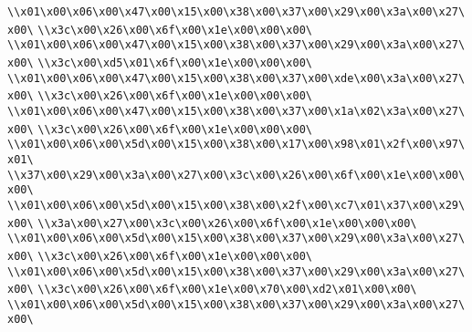 \verb|\\x01\x00\x06\x00\x47\x00\x15\x00\x38\x00\x37\x00\x29\x00\x3a\x00\x27\x00\|\newline
\verb|\\x3c\x00\x26\x00\x6f\x00\x1e\x00\x00\x00\|\newline
\verb|\\x01\x00\x06\x00\x47\x00\x15\x00\x38\x00\x37\x00\x29\x00\x3a\x00\x27\x00\|\newline
\verb|\\x3c\x00\xd5\x01\x6f\x00\x1e\x00\x00\x00\|\newline
\verb|\\x01\x00\x06\x00\x47\x00\x15\x00\x38\x00\x37\x00\xde\x00\x3a\x00\x27\x00\|\newline
\verb|\\x3c\x00\x26\x00\x6f\x00\x1e\x00\x00\x00\|\newline
\verb|\\x01\x00\x06\x00\x47\x00\x15\x00\x38\x00\x37\x00\x1a\x02\x3a\x00\x27\x00\|\newline
\verb|\\x3c\x00\x26\x00\x6f\x00\x1e\x00\x00\x00\|\newline
\verb|\\x01\x00\x06\x00\x5d\x00\x15\x00\x38\x00\x17\x00\x98\x01\x2f\x00\x97\x01\|\newline
\verb|\\x37\x00\x29\x00\x3a\x00\x27\x00\x3c\x00\x26\x00\x6f\x00\x1e\x00\x00\x00\|\newline
\verb|\\x01\x00\x06\x00\x5d\x00\x15\x00\x38\x00\x2f\x00\xc7\x01\x37\x00\x29\x00\|\newline
\verb|\\x3a\x00\x27\x00\x3c\x00\x26\x00\x6f\x00\x1e\x00\x00\x00\|\newline
\verb|\\x01\x00\x06\x00\x5d\x00\x15\x00\x38\x00\x37\x00\x29\x00\x3a\x00\x27\x00\|\newline
\verb|\\x3c\x00\x26\x00\x6f\x00\x1e\x00\x00\x00\|\newline
\verb|\\x01\x00\x06\x00\x5d\x00\x15\x00\x38\x00\x37\x00\x29\x00\x3a\x00\x27\x00\|\newline
\verb|\\x3c\x00\x26\x00\x6f\x00\x1e\x00\x70\x00\xd2\x01\x00\x00\|\newline
\verb|\\x01\x00\x06\x00\x5d\x00\x15\x00\x38\x00\x37\x00\x29\x00\x3a\x00\x27\x00\|\newline
